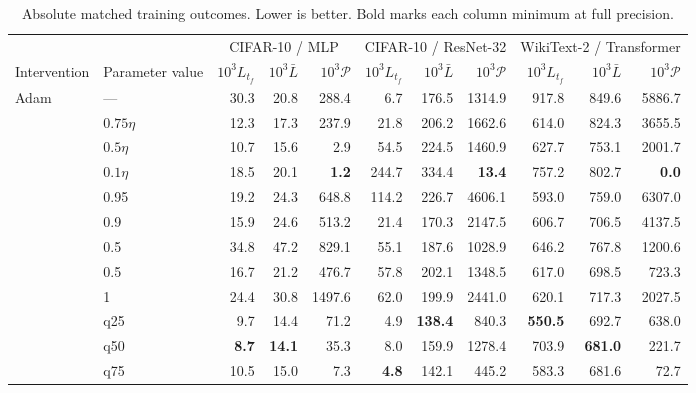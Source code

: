 \begin{table}[!tp]
\caption{Absolute matched training outcomes. Lower is better. Bold marks each column minimum at full precision.}
\label{tab:vc-outcomes}
\centering\fontsize{8.5}{10.5}\selectfont
\setlength{\tabcolsep}{4pt}
\renewcommand{\arraystretch}{1.13}
\begin{tabular}{llrrrrrrrrr}
\toprule
 & & \multicolumn{3}{c}{CIFAR-10 / MLP} & \multicolumn{3}{c}{CIFAR-10 / ResNet-32} & \multicolumn{3}{c}{WikiText-2 / Transformer} \\
\cmidrule(lr){3-5}\cmidrule(lr){6-8}\cmidrule(lr){9-11}
Intervention & Parameter value & $10^3 L_{t_f}$ & $10^3\bar L$ & $10^3\mathcal P$ & $10^3 L_{t_f}$ & $10^3\bar L$ & $10^3\mathcal P$ & $10^3 L_{t_f}$ & $10^3\bar L$ & $10^3\mathcal P$ \\
\midrule
Adam & --- & 30.3 & 20.8 & 288.4 & 6.7 & 176.5 & 1314.9 & 917.8 & 849.6 & 5886.7 \\
\addlinespace[3pt]
\multirow{3}{*}{LR reduction} & $0.75\eta$ & 12.3 & 17.3 & 237.9 & 21.8 & 206.2 & 1662.6 & 614.0 & 824.3 & 3655.5 \\
 & $0.5\eta$ & 10.7 & 15.6 & 2.9 & 54.5 & 224.5 & 1460.9 & 627.7 & 753.1 & 2001.7 \\
 & $0.1\eta$ & 18.5 & 20.1 & \textbf{1.2} & 244.7 & 334.4 & \textbf{13.4} & 757.2 & 802.7 & \textbf{0.0} \\
\addlinespace[3pt]
\multirow{3}{*}{$\beta_2$ reduction} & 0.95 & 19.2 & 24.3 & 648.8 & 114.2 & 226.7 & 4606.1 & 593.0 & 759.0 & 6307.0 \\
 & 0.9 & 15.9 & 24.6 & 513.2 & 21.4 & 170.3 & 2147.5 & 606.7 & 706.5 & 4137.5 \\
 & 0.5 & 34.8 & 47.2 & 829.1 & 55.1 & 187.6 & 1028.9 & 646.2 & 767.8 & 1200.6 \\
\addlinespace[3pt]
\multirow{2}{*}{Gradient clipping} & 0.5 & 16.7 & 21.2 & 476.7 & 57.8 & 202.1 & 1348.5 & 617.0 & 698.5 & 723.3 \\
 & 1 & 24.4 & 30.8 & 1497.6 & 62.0 & 199.9 & 2441.0 & 620.1 & 717.3 & 2027.5 \\
\addlinespace[3pt]
\multirow{3}{*}{Displacement cap} & q25 & 9.7 & 14.4 & 71.2 & 4.9 & \textbf{138.4} & 840.3 & \textbf{550.5} & 692.7 & 638.0 \\
 & q50 & \textbf{8.7} & \textbf{14.1} & 35.3 & 8.0 & 159.9 & 1278.4 & 703.9 & \textbf{681.0} & 221.7 \\
 & q75 & 10.5 & 15.0 & 7.3 & \textbf{4.8} & 142.1 & 445.2 & 583.3 & 681.6 & 72.7 \\
\bottomrule
\end{tabular}
\end{table}
